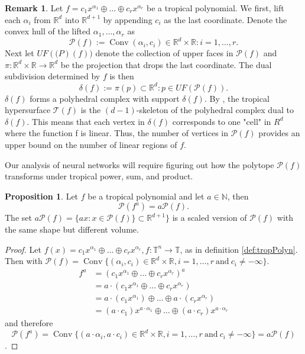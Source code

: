 \documentclass{article}
\theoremstyle{definition}
\newtheorem{proposition}[theorem]{Proposition}
\newtheorem{remark}[theorem]{Remark}
\DeclareMathOperator{\Conv}{Conv}
\begin{document}
\begin{remark}\cite[p.~3]{zhang2018tropical}
Let $f = c_1 x^{\alpha_1} \oplus \dots \oplus c_r x^{\alpha_r}$ be a tropical polynomial. We first, lift each $\alpha_i$ from $\mathbb{R}^d$ into $\mathbb{R}^{d+1}$ by appending $c_i$ as the last coordinate. Denote the convex hull of the lifted $\alpha_1, \dots , \alpha_r$ as
$$\mathcal{P}(f):= \Conv{(\alpha_i, c_i) \in \mathbb{R}^{d} \times \mathbb{R} : i = 1, \dots , r}.$$
Next let $UF(\mathcal(P)(f))$ denote the collection of upper faces in $\mathcal{P}(f)$ and $\pi : \mathbb{R}^{d} \times \mathbb{R} \to \mathbb{R}^{d}$ be the projection that drops
the last coordinate. The dual subdivision determined by $f$
is then
$$\delta(f) := {\pi(p) \subset \mathbb{R}^{d} : p \in UF( \mathcal{P}(f))}.$$
$\delta (f)$ forms a polyhedral complex with support $\delta (f)$. By \cite[Proposition 3.1.6.]{maclagan2015introduction}, the tropical hypersurface $\mathcal{T}(f)$ is the $(d - 1)$-skeleton of the polyhedral complex dual to $ \delta(f)$. This means that each vertex in $ \delta(f)$ corresponds to one "cell" in $R^{d}$ where the function f is linear. Thus, the number of vertices in $\mathcal{P}(f)$ provides an upper bound on the number of linear regions of $f$.
\end{remark}

Our analysis of neural networks will require figuring out
how the polytope $\mathcal{P}(f)$ transforms under tropical power,
sum, and product.

\begin{proposition}\cite[p.~4]{zhang2018tropical}
Let $f$ be a tropical polynomial and let $a \in \mathbb{N}$, then
$$ \mathcal{P}(f^{a}) = a \mathcal{P}(f).$$
The set $a \mathcal{P}(f) = \{ax : x \in \mathcal{P}(f) \} \subset \mathbb{R}^{d + 1}\}$ is a scaled version of $\mathcal{P}(f)$ with the same shape but different volume.
\end{proposition}
\begin{proof}
Let $f(x)=c_{1}x^{\alpha_1} \oplus \dots \oplus c_{r}x^{\alpha_r}, f:\mathbb{T}^{n} \to \mathbb{T}$, as in definition \ref{def:tropPolyn}. Then with $\mathcal{P}(f) = \Conv\{(\alpha_{i}, c_{i}) \in \mathbb{R}^{d} \times \mathbb{R}, i= 1, \dots , r \ \text{and} \ c_{i} \neq - \infty \}$.
\begin{align*}
f^{a} &= (c_{1}x^{\alpha_{1}} \oplus \dots \oplus c_{r} x^{\alpha_{r}})^{a} \\
&= a \cdot (c_{1}x^{\alpha_{1}} \oplus \dots \oplus c_{r} x^{\alpha_{r}}) \\
&= a \cdot (c_{1}x^{\alpha_{1}}) \oplus \dots \oplus a \cdot (c_{r} x^{\alpha_{r}}) \\
&= (a \cdot c_{1})x^{a \cdot \alpha_{1}} \oplus \dots \oplus (a \cdot c_{r}) x^{a \cdot \alpha_{r}}
\end{align*}
and therefore
$$\mathcal{P}(f^{a}) = \Conv\{(a \cdot \alpha_{i}, a \cdot c_{i}) \in \mathbb{R}^{d} \times \mathbb{R}, i = 1, \dots, r \ \text{and} \ c_{i} \neq - \infty \} = a\mathcal{P}(f)$$.
\end{proof}
\end{document}
